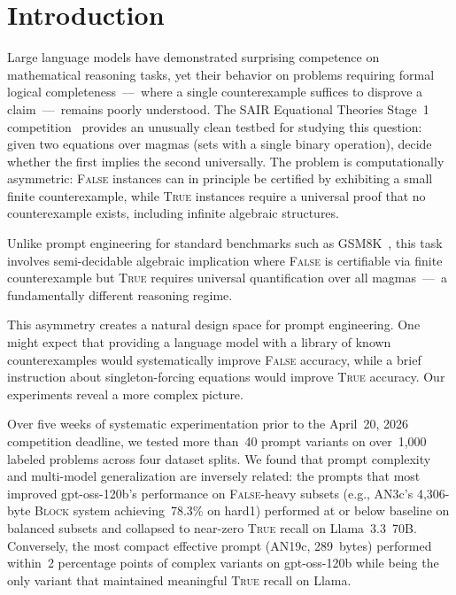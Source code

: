 \documentclass[11pt]{article}
\begin{document}
\section{Introduction}

Large language models have demonstrated surprising competence on
mathematical reasoning tasks, yet their behavior on problems requiring
formal logical completeness~---~where a single counterexample suffices
to disprove a claim~---~remains poorly understood. The SAIR Equational
Theories Stage~1 competition~\citep{tao2026sair} provides an unusually
clean testbed for studying this question: given two equations over magmas
(sets with a single binary operation), decide whether the first implies
the second universally. The problem is computationally asymmetric:
\textsc{False} instances can in principle be certified by exhibiting a
small finite counterexample, while \textsc{True} instances require a
universal proof that no counterexample exists, including infinite
algebraic structures.

Unlike prompt engineering for standard benchmarks such as
GSM8K~\citep{cobbe2021gsm8k}, this task involves semi-decidable
algebraic implication where \textsc{False} is certifiable via finite
counterexample but \textsc{True} requires universal quantification over
all magmas~---~a fundamentally different reasoning regime.

This asymmetry creates a natural design space for prompt engineering.
One might expect that providing a language model with a library of known
counterexamples would systematically improve \textsc{False} accuracy,
while a brief instruction about singleton-forcing equations would
improve \textsc{True} accuracy. Our experiments reveal a more complex
picture.

Over five weeks of systematic experimentation prior to the April~20,
2026 competition deadline, we tested more than~40 prompt variants on
over~1{,}000 labeled problems across four dataset splits. We found that
prompt complexity and multi-model generalization are inversely related:
the prompts that most improved gpt-oss-120b's performance on
\textsc{False}-heavy subsets (e.g., AN3c's 4{,}306-byte \textsc{Block}
system achieving~78.3\% on hard1) performed at or below baseline on
balanced subsets and collapsed to near-zero \textsc{True} recall on
Llama~3.3~70B. Conversely, the most compact effective prompt (AN19c,
289~bytes) performed within~2 percentage points of complex variants on
gpt-oss-120b while being the only variant that maintained meaningful
\textsc{True} recall on Llama.
\end{document}
